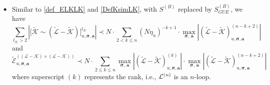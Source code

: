 \documentclass[10pt,reqno]{article}
\theoremstyle{plain} %
\theoremstyle{remark}
\numberwithin{equation}{section}
\begin{document}
   \begin{itemize}
       \item Similar to \eqref{def_ELKLK} and \eqref{DefKsimLK},  with $S^{(B)}$ replaced by $S^{(B)}_{GUE}$, we have 
      \begin{equation}
       \label{WLK2}\sum_{l_\mathcal{K} > 2} \left|\Big[\mathcal{\widetilde{K}} \sim (\mathcal{\widetilde{L}} - \mathcal{\widetilde{K}})\Big]^{l_\mathcal{K}}_{u, \boldsymbol{\sigma},\textbf{a}} \right|
       \prec N\cdot
       \sum_{2<k\le n} (N\eta_u)^{-k+1}\cdot \max_{\boldsymbol{\sigma}, \,\textbf{a}}   \left|(\mathcal{\widetilde{L}}-\mathcal{\widetilde{K}})^{(n-k+2)}_{u, \boldsymbol{\sigma}, \textbf{a}}\right|
       \end{equation}
        and  \begin{equation}\label{WLK3}\mathcal{\widetilde{E}}^{((\mathcal{L} - \mathcal{K}) \times (\mathcal{L} - \mathcal{K}))}_{u, \boldsymbol{\sigma}, \textbf{a}}\prec N\cdot \sum_{2\le k\le n} \max_{\boldsymbol{\sigma}, \,\textbf{a}}   \left|(\mathcal{\widetilde{L}}-\mathcal{\widetilde{K}})^{(k)}_{u, \boldsymbol{\sigma}, \textbf{a}}\right|\cdot \max_{\boldsymbol{\sigma}, \,\textbf{a}}   \left|(\mathcal{\widetilde{L}}-\mathcal{\widetilde{K}})^{(n-k+2)}_{u, \boldsymbol{\sigma}, \textbf{a}}\right|
        \end{equation}
      where superscript $(k)$ represents the rank, i.e., ${\cal L}^{(n)}$ is an $n$-loop.        \bigskip


 
 

\end{itemize}
\end{document}
